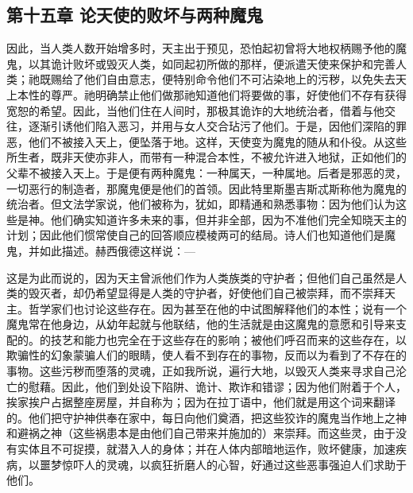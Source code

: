 \subsection{第十五章 论天使的败坏与两种魔鬼}

因此，当人类人数开始增多时，天主出于预见，恐怕起初曾将大地权柄赐予他的魔鬼，以其诡计败坏或毁灭人类，如同起初所做的那样，便派遣天使来保护和完善人类；祂既赐给了他们自由意志，便特别命令他们不可沾染地上的污秽，以免失去天上本性的尊严。祂明确禁止他们做那祂知道他们将要做的事，好使他们不存有获得宽恕的希望。因此，当他们住在人间时，那极其诡诈的大地统治者，借着与他交往，逐渐引诱他们陷入恶习，并用与女人交合玷污了他们。于是，因他们深陷的罪恶，他们不被接入天上，便坠落于地。这样，天使变为魔鬼的随从和仆役。从这些所生者，既非天使亦非人，而带有一种混合本性，不被允许进入地狱，正如他们的父辈不被接入天上。于是便有两种魔鬼：一种属天，一种属地。后者是邪恶的灵，一切恶行的制造者，那魔鬼便是他们的首领。因此特里斯墨吉斯忒斯称他为魔鬼的统治者。但文法学家说，他们被称为，犹如，即精通和熟悉事物：因为他们认为这些是神。他们确实知道许多未来的事，但并非全部，因为不准他们完全知晓天主的计划；因此他们惯常使自己的回答顺应模棱两可的结局。诗人们也知道他们是魔鬼，并如此描述。赫西俄德这样说：—\par

\par

这是为此而说的，因为天主曾派他们作为人类族类的守护者；但他们自己虽然是人类的毁灭者，却仍希望显得是人类的守护者，好使他们自己被崇拜，而不崇拜天主。哲学家们也讨论这些存在。因为甚至在他的中试图解释他们的本性；说有一个魔鬼常在他身边，从幼年起就与他联结，他的生活就是由这魔鬼的意愿和引导来支配的。的技艺和能力也完全在于这些存在的影响；被他们呼召而来的这些存在，以欺骗性的幻象蒙骗人们的眼睛，使人看不到存在的事物，反而以为看到了不存在的事物。这些污秽而堕落的灵魂，正如我所说，遍行大地，以毁灭人类来寻求自己沦亡的慰藉。因此，他们到处设下陷阱、诡计、欺诈和错谬；因为他们附着于个人，挨家挨户占据整座房屋，并自称为；因为在拉丁语中，他们就是用这个词来翻译的。他们把守护神供奉在家中，每日向他们奠酒，把这些狡诈的魔鬼当作地上之神和避祸之神（这些祸患本是由他们自己带来并施加的）来崇拜。而这些灵，由于没有实体且不可捉摸，就潜入人的身体；并在人体内部暗地运作，败坏健康，加速疾病，以噩梦惊吓人的灵魂，以疯狂折磨人的心智，好通过这些恶事强迫人们求助于他们。\par

